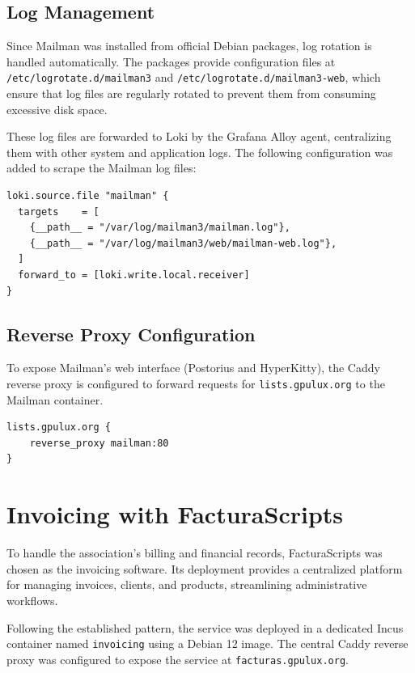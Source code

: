 \subsection*{Log Management}

Since Mailman was installed from official Debian packages, log rotation is handled automatically. The packages provide configuration files at \texttt{/etc/logrotate.d/mailman3} and \texttt{/etc/logrotate.d/mailman3-web}, which ensure that log files are regularly rotated to prevent them from consuming excessive disk space.

These log files are forwarded to Loki by the Grafana Alloy agent, centralizing them with other system and application logs. The following configuration was added to scrape the Mailman log files:

\begin{lstlisting}[caption={Grafana Alloy configuration forwarding Mailman logs to Loki}]
loki.source.file "mailman" {
  targets    = [
    {__path__ = "/var/log/mailman3/mailman.log"},
    {__path__ = "/var/log/mailman3/web/mailman-web.log"},
  ]
  forward_to = [loki.write.local.receiver]
}
\end{lstlisting}

\subsection*{Reverse Proxy Configuration}

To expose Mailman's web interface (Postorius and HyperKitty), the Caddy reverse proxy is configured to forward requests for \texttt{lists.gpulux.org} to the Mailman container.

\begin{lstlisting}[caption={Caddyfile configuration used to expose Mailman 3 via the reverse proxy}]
lists.gpulux.org {
    reverse_proxy mailman:80
}
\end{lstlisting}

\section{Invoicing with FacturaScripts}

To handle the association's billing and financial records, FacturaScripts was chosen as the invoicing software. Its deployment provides a centralized platform for managing invoices, clients, and products, streamlining administrative workflows.

Following the established pattern, the service was deployed in a dedicated Incus container named \texttt{invoicing} using a Debian 12 image. The central Caddy reverse proxy was configured to expose the service at \texttt{facturas.gpulux.org}.

